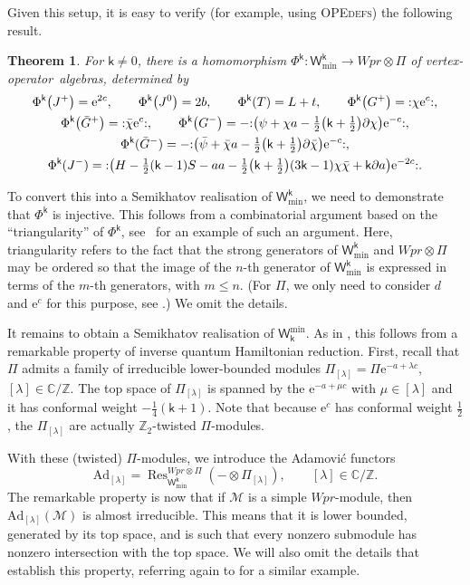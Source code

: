 \documentclass[10pt,a4paper]{amsart}
\numberwithin{equation}{section}
\newcommand{\pd}{\partial} %
\newcommand{\bchi}{\bar{\chi}{}} %
\newcommand{\bpsi}{\bar{\psi}{}} %
\newcommand{\bG}{\bar{G}{}}
\newcommand{\ee}{\mathrm{e}} %
\newcommand{\kk}{\mathsf{k}} %
\renewcommand{\le}{\leqslant} %
\DeclarePairedDelimiter{\brac}{\lparen}{\rparen} %
\newcommand{\no}[1]{\mathopen{:} #1 \mathclose{:}} %
\newcommand{\blank}{{-}} %
\newcommand{\fld}[1]{\mathbb{#1}} %
\newcommand{\VOA}[1]{\mathsf{#1}} %
\newcommand{\Mod}[1]{\mathcal{#1}} %
\newcommand{\categ}[1]{\mathrm{#1}} %
\newcommand{\ZZ}{\fld{Z}}
\newcommand{\CC}{\fld{C}}
\newcommand{\lsymb}{\Pi}
\newcommand{\lvoa}{\lsymb} %
\newcommand{\uwalg}[2]{\VOA{W}^{#1}_{\mathrm{#2}}} %
\newcommand{\swalg}[2]{\VOA{W}_{#1}^{\mathrm{#2}}} %
\newcommand{\upr}[1][\kk]{\uwalg{#1}{pr}} %
\newcommand{\umin}[1][\kk]{\uwalg{#1}{min}} %
\newcommand{\smin}[1][\kk]{\swalg{#1}{min}} %
\newcommand{\lmod}[1]{\lsymb_{[#1]}} %
\newcommand{\adfunc}[1]{\categ{Ad}_{[#1]}}
\DeclareMathOperator{\res}{\categ{Res}}
\newcommand{\vo}{vertex-operator}
\newcommand{\voa}{\vo\ algebra}
\newcommand{\voas}{\voa s}
\newcommand{\qhr}{quantum Hamiltonian reduction} %
\newtheorem{Theorem}{Theorem}[section]
\def\smash#1{#1}
\def\upr{Wpr}
\def\qhr{quantum Hamiltonian reduction}
\begin{document}
Given this setup, it is easy to verify (for example, using \textsc{OPEdefs}) the following result.
%
\begin{Theorem} \label{thm:usemi}
	For $\kk \neq 0$, there is a homomorphism $\Phi^{\kk} \colon \umin \to \upr \otimes \lvoa$ of \voas, determined by
	\begin{gather}
			\Phi^{\kk}\big(J^+\big) = \ee^{2c}, \qquad
			\Phi^{\kk}\big(J^0\big) = 2b, \qquad
			\Phi^{\kk}(T) = L + t, \qquad
			\Phi^{\kk}\big(G^+\big) = \no{\chi \ee^c}, \nonumber \\
			\Phi^{\kk}\big(\bG^+\big) = \no{\bchi \ee^c},\qquad
			\Phi^{\kk}\big(G^-\big) = -\no{\brac[\big]{\psi + \chi a - \tfrac{1}{2}\bigl(\kk+\tfrac{1}{2}\bigr)\pd \chi} \ee^{-c}}, \nonumber \\
			\Phi^{\kk}(\bG^-) = -\no{\brac[\big]{\bpsi + \bchi a - \tfrac{1}{2}\bigl(\kk+\tfrac{1}{2}\bigr)\pd \bchi} \ee^{-c}},\nonumber \\
			\Phi^{\kk}(J^-) = \no{\brac[\big]{H - \tfrac{1}{2}(\kk-1) S - aa - \tfrac{1}{2}\bigl(\kk+\tfrac{1}{2}\bigr)(3\kk-1) \chi \bchi + \kk \pd a} \ee^{-2 c}}.\label{eq:usemi}
		\end{gather}
\end{Theorem}

To convert this into a Semikhatov realisation of $\umin$, we need to demonstrate that $\Phi^{\kk}$ is injective.
This follows from a combinatorial argument based on the ``triangularity'' of $\Phi^{\kk}$, see~\cite{AdaRea20} for an example of such an argument.
Here, triangularity refers to the fact that the strong generators of $\umin$ and $\upr \otimes \lvoa$ may be ordered so that the image of the $n$-th generator of $\umin$ is expressed in terms of the $m$-th generators, with $m \le n$.
(For $\lvoa$, we only need to consider $d$ and $\ee^c$ for this purpose, see \cite{AdaRea20}.)
We omit the details.

It remains to obtain a Semikhatov realisation of $\smin$.
As in \cite{AdaRea20}, this follows from a remarkable property of inverse \qhr.
First, recall \cite{BerRep01} that $\lvoa$ admits a family of irreducible lower-bounded modules
\smash{$
	\lmod{\lambda} = \Pi \ee^{-a+\lambda c}$}, $ [\lambda] \in \CC/\ZZ$.
The top space of \smash{$\lmod{\lambda}$} is spanned by the $\ee^{-a+\mu c}$ with $\mu \in [\lambda]$ and it has conformal weight $-\frac{1}{4}(\kk+1)$.
Note that because $\ee^c$ has conformal weight $\frac{1}{2}$, the \smash{$\lmod{\lambda}$} are actually $\ZZ_2$-twisted $\lvoa$-modules.

With these (twisted) $\lvoa$-modules, we introduce the Adamovi\'{c} functors
\begin{equation} \label{eq:adfunct}
	\adfunc{\lambda} = \res^{\upr \otimes \lvoa}_{\umin} (\blank \otimes \lmod{\lambda}), \qquad [\lambda] \in \CC/\ZZ.
\end{equation}
The remarkable property is now that if $\Mod{M}$ is a simple \smash{$\upr$}-module, then $\adfunc{\lambda}(\Mod{M})$ is almost irreducible.
This means that it is lower bounded, generated by its top space, and is such that every nonzero submodule has nonzero intersection with the top space.
We will also omit the details that establish this property, referring again to \cite{AdaRea20} for a similar example.
\end{document}
